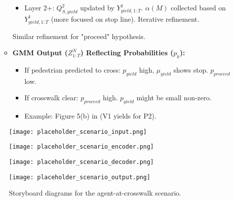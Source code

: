 \begin{enumerate}
\begin{itemize}
\begin{itemize}
            \item Layer 2+: $Q_{S,yield}^2$ updated by $Y_{yield,1:T}^1$. $\alpha(M)$ collected based on $Y_{yield,1:T}^1$ (more focused on stop line). Iterative refinement.
        \end{itemize}
        Similar refinement for "proceed" hypothesis.
        \item \textbf{GMM Output ($Z_{1:T}^N$) Reflecting Probabilities ($p_k$):}
        \begin{itemize}
            \item If pedestrian predicted to cross: $p_{yield}$ high, $\mu_{yield}$ shows stop. $p_{proceed}$ low.
            \item If crosswalk clear: $p_{proceed}$ high. $p_{yield}$ might be small non-zero.
            \item Example: Figure 5(b) in \cite{Shi2022MTR} (V1 yields for P2).
        \end{itemize}
    \end{itemize}
\end{enumerate}

\begin{figure}[h!]
    \centering
    \begin{minipage}{0.48\textwidth}
        \texttt{[image: placeholder\_scenario\_input.png]}
    \end{minipage}\hfill
    \begin{minipage}{0.48\textwidth}
        \texttt{[image: placeholder\_scenario\_encoder.png]}
    \end{minipage}
    \vspace{0.5cm}
    \begin{minipage}{0.48\textwidth}
        \texttt{[image: placeholder\_scenario\_decoder.png]}
    \end{minipage}\hfill
    \begin{minipage}{0.48\textwidth}
        \texttt{[image: placeholder\_scenario\_output.png]}
    \end{minipage}
    \caption{Storyboard diagrams for the agent-at-crosswalk scenario.}
    \label{fig:scenario_storyboard}
\end{figure}

